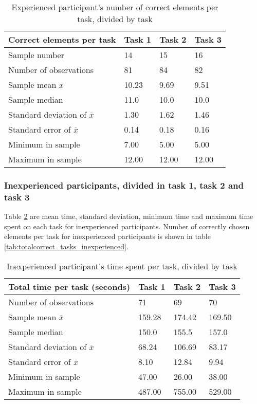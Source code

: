 \begin{table}[H]
	\centering
	\begin{tabular}{l|l|l|l}
		Correct elements per task & Task 1 & Task 2 & Task 3 \\ \hline
		Sample number & 14 & 15  & 16   \\
		Number of observations & 81    & 84      & 82   \\
		Sample mean $\overline{x}$ & 10.23  &  9.69  &  9.51   \\
		Sample median & 11.0  &  10.0  &  10.0  \\
		Standard deviation of $\overline{x}$ & 1.30  & 1.62  & 1.46   \\
		Standard error of $\overline{x}$ & 0.14  & 0.18  & 0.16   \\
		Minimum in sample & 7.00 & 5.00 &  5.00 \\
		Maximum in sample  & 12.00 & 12.00  & 12.00 \\ \hline
	\end{tabular}
	\caption[Correct elements, task and experienved divided]{Experienced participant's number of correct elements per task, divided by task}
	\label{tab:totalcorrect_tasks_experienced}
\end{table}

\subsubsection{Inexperienced participants, divided in task 1, task 2 and task 3}\label{sec:taskdivided_inexperienced}

Table \ref{tab:totaltime_tasks_inexperienced} are mean time, standard deviation, minimum time and maximum time spent on each task for inexperienced participants. Number of correctly chosen elements per task for inexperienced participants is shown in table \ref{tab:totalcorrect_tasks_inexperienced}. 

\begin{table}[H]
	\centering
	\begin{tabular}{l|l|l|l}
		Total time per task (seconds) & Task 1 & Task 2 & Task 3 \\ \hline
		Number of observations & 71    & 69  & 70   \\
		Sample mean $\overline{x}$  & 159.28  &  174.42  &  169.50  \\
		Sample median & 150.0  &  155.5  &  157.0  \\
		Standard deviation of $\overline{x}$  & 68.24  & 106.69  & 83.17   \\
		Standard error of $\overline{x}$  & 8.10  & 12.84  & 9.94   \\
		Minimum in sample & 47.00 & 26.00 &  38.00 \\
		Maximum in sample & 487.00 & 755.00  & 529.00  \\ \hline
	\end{tabular}
	\caption[Total time, inexperienced per task]{Inexperienced participant's time spent per task, divided by task}
	\label{tab:totaltime_tasks_inexperienced}
\end{table}

